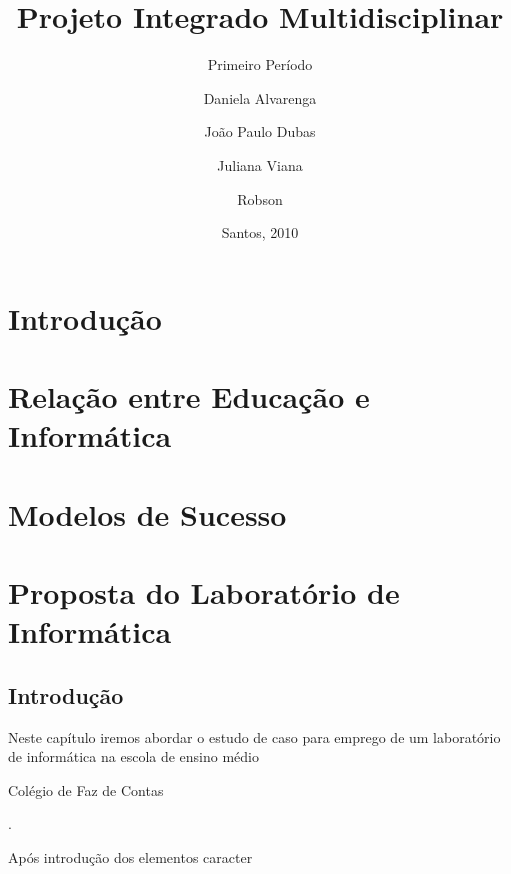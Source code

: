 \documentclass[a4paper, 10pt]{report}
\begin{document}
\title{Projeto Integrado Multidisciplinar}
\subtitle{Primeiro Período}
\author{Daniela Alvarenga
    \and João Paulo Dubas
    \and Juliana Viana
    \and Robson \ldot}
\date{Santos, 2010}

\maketitle
\tableofcontents

\chapter{Introdução}

\chapter[Educação versus Informática]{Relação entre Educação e Informática}

\chapter{Modelos de Sucesso}

\chapter[Laboratório]{Proposta do Laboratório de Informática}
\section{Introdução}

Neste capítulo iremos abordar o estudo de caso para emprego de um
laboratório de informática na escola de ensino médio
\begin{bfseries}Colégio de Faz de Contas\end{bfseries}.

Após introdução dos elementos caracter
\end{document}
